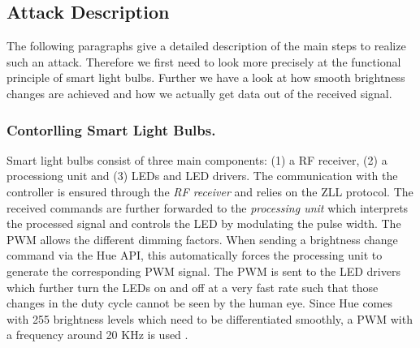 
\subsection{Attack Description} %
\label{sec:exp:description}


The following paragraphs give a detailed description of the main steps to realize such an attack. Therefore we first need to look more precisely at the functional principle of smart light bulbs. Further we have a look at how smooth brightness changes are achieved and how we actually get data out of the received signal.\newline



\subsubsection{Contorlling Smart Light Bulbs.} 
Smart light bulbs consist of three main components: (1) a RF receiver, (2) a processiong unit and (3) LEDs and LED drivers.
The communication with the controller is ensured through the \textit{RF receiver} and relies on the ZLL protocol. The received commands are further forwarded to the \textit{processing unit} which interprets the processed signal and controls the LED by modulating the pulse width. The PWM allows the different dimming factors. When sending a brightness change command via the Hue API, this automatically forces the processing unit to generate the corresponding PWM signal. The PWM is sent to the LED drivers which further turn the LEDs on and off at a very fast rate such that those changes in the duty cycle cannot be seen by the human eye. Since Hue comes with 255 brightness levels which need to be differentiated smoothly, a PWM with a frequency around 20 KHz is used \cite{Ronen:2016:EFAIDCSL}. 


